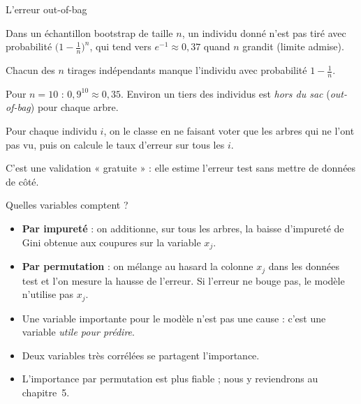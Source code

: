 \documentclass[aspectratio=169,11pt]{beamer}
\begin{document}
\begin{frame}{L'erreur out-of-bag}
  \begin{proposition}
    Dans un échantillon bootstrap de taille $n$, un individu donné n'est pas tiré avec probabilité $\big(1-\frac1n\big)^n$, qui tend vers $e^{-1}\approx0{,}37$ quand $n$ grandit (limite admise).
  \end{proposition}
  \begin{preuve}
    Chacun des $n$ tirages indépendants manque l'individu avec probabilité $1-\frac1n$.
  \end{preuve}
  {\small Pour $n=10$ : $0{,}9^{10}\approx0{,}35$. Environ un tiers des individus est \emph{hors du sac} (\emph{out-of-bag}) pour chaque arbre.}
  \begin{definition}
    Pour chaque individu $i$, on le classe en ne faisant voter que les arbres qui ne l'ont pas vu, puis on calcule le taux d'erreur sur tous les $i$.
  \end{definition}
  {\small\color{cnfGris}C'est une validation « gratuite » : elle estime l'erreur test sans mettre de données de côté.}
\end{frame}

\begin{frame}{Quelles variables comptent ?}
  \begin{definition}
    \begin{itemize}\setlength\itemsep{1pt}
      \item \textbf{Par impureté} : on additionne, sur tous les arbres, la baisse d'impureté de Gini obtenue aux coupures sur la variable $x_j$.
      \item \textbf{Par permutation} : on mélange au hasard la colonne $x_j$ dans les données test et l'on mesure la hausse de l'erreur. Si l'erreur ne bouge pas, le modèle n'utilise pas $x_j$.
    \end{itemize}
  \end{definition}
  \begin{remarque}[Précautions]
    \begin{itemize}\setlength\itemsep{1pt}
      \item Une variable importante pour le modèle n'est pas une cause : c'est une variable \emph{utile pour prédire}.
      \item Deux variables très corrélées se partagent l'importance.
      \item L'importance par permutation est plus fiable ; nous y reviendrons au chapitre~5.
    \end{itemize}
  \end{remarque}
\end{frame}
\end{document}
